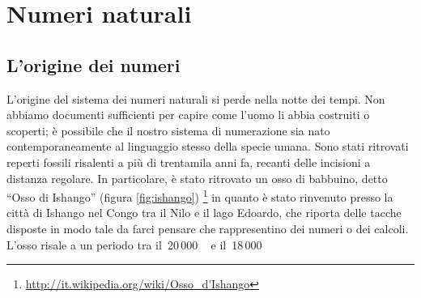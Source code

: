 


\chapter{Numeri naturali}
\section{L'origine dei numeri}
\label{sec:nat_origine}

L'origine del sistema dei numeri naturali si perde nella notte dei tempi. 
Non abbiamo documenti sufficienti per capire come l'uomo li abbia costruiti 
o scoperti; è possibile che il nostro sistema di numerazione sia nato 
contemporaneamente al linguaggio stesso della specie umana. 
Sono stati ritrovati reperti fossili risalenti a più di trentamila
anni fa, recanti delle incisioni a distanza regolare. 
In particolare, è stato ritrovato un osso di babbuino, 
detto “Osso di Ishango” 
(figura \ref{fig:ishango}) 
\footnote{\url{http://it.wikipedia.org/wiki/Osso_d'Ishango}} 
in quanto è stato rinvenuto presso la città di Ishango nel Congo tra il 
Nilo e il lago Edoardo, che riporta delle tacche disposte in modo tale da 
farci pensare che rappresentino dei numeri o dei calcoli. L'osso risale a
un periodo tra il~20\,000\,~\aC~e il~18\,000\,~\aC

